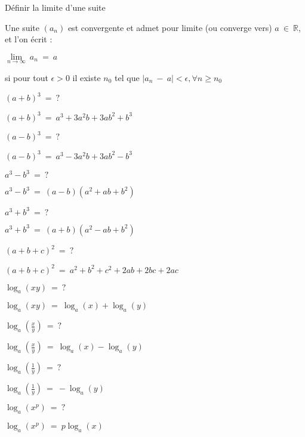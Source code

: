 \documentclass[12pt]{article}
\newcommand*{\xfield}[1]{\begin{mdframed}\centering #1\end{mdframed}\bigskip}
\newenvironment{note}{}{}
\begin{document}
\begin{note}
    \xfield{Définir la limite d'une suite}
    \xfield{
        Une suite $(a_n)$ est convergente et admet pour limite (ou converge vers) $a\ \in\ \mathbb{R}$, et l'on écrit :\\
        \begin{center}
        $\lim\limits_{n \to \infty}\ a_n\ =\ a$
        \end{center}
        si pour tout $\epsilon >0$ il existe $n_0$ tel que $|a_n\ -\ a| < \epsilon, \forall n \ge n_0$
    }
\end{note}

\begin{note}
    \xfield{$(a+b)^3\ =\ ?$}
    \xfield{$(a+b)^3\ =\ a^3 + 3a^2b+3ab^2+b^3$}
\end{note}

\begin{note}
    \xfield{$(a-b)^3\ =\ ?$}
    \xfield{$(a-b)^3\ =\ a^3 - 3a^2b+3ab^2-b^3$}
\end{note}

\begin{note}
    \xfield{$a^3-b^3\ =\ ?$}
    \xfield{$a^3-b^3\ =\ (a-b)(a^2+ab+b^2)$}
\end{note}

\begin{note}
    \xfield{$a^3+b^3\ =\ ?$}
    \xfield{$a^3+b^3\ =\ (a+b)(a^2-ab+b^2)$}
\end{note}

\begin{note}
    \xfield{$(a+b+c)^2\ =\ ?$}
    \xfield{$(a+b+c)^2\ =\ a^2+b^2+c^2+2ab+2bc+2ac$}
\end{note}

\begin{note}
    \xfield{$\log_a(xy)\ =\ ?$}
    \xfield{$\log_a(xy)\ =\ \log_a(x)+\log_a(y)$}
\end{note}

\begin{note}
    \xfield{$\log_a(\frac{x}{y})\ =\ ?$}
    \xfield{$\log_a(\frac{x}{y})\ =\ \log_a(x)-\log_a(y)$}
\end{note}

\begin{note}
    \xfield{$\log_a(\frac{1}{y})\ =\ ?$}
    \xfield{$\log_a(\frac{1}{y})\ =\ -\log_a(y)$}
\end{note}

\begin{note}
    \xfield{$\log_a(x^p)\ =\ ?$}
    \xfield{$\log_a(x^p)\ =\ p \log_a(x)$}
\end{note}
\end{document}
